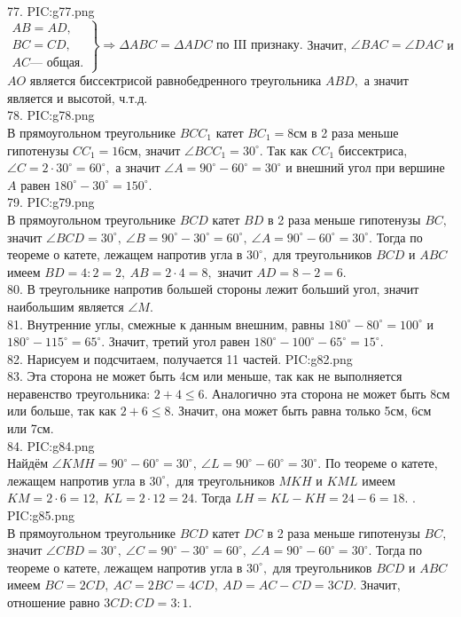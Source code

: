 77. {{PIC:g77.png}}\\
$\left.\begin{array}{l}AB=AD,\\
BC=CD,\\
AC\text{--- общая.}  \end{array}\right\}\Rightarrow \Delta ABC=\Delta ADC\text{ по III признаку.}$ Значит, $\angle BAC=\angle DAC$ и $AO$ является биссектрисой равнобедренного треугольника $ABD,$ а значит является и высотой, ч.т.д.\\
78. {{PIC:g78.png}}\\
В прямоугольном треугольнике $BCC_1$ катет $BC_1=8$см в 2 раза меньше гипотенузы $CC_1=16$см, значит $\angle BCC_1=30^\circ.$ Так как $CC_1$ биссектриса, $\angle C=2\cdot30^\circ=60^\circ,$ а значит $\angle A=90^\circ-60^\circ=30^\circ$ и внешний угол при вершине $A$ равен $180^\circ-30^\circ=150^\circ.$\\
79. {{PIC:g79.png}}\\
В прямоугольном треугольнике $BCD$ катет $BD$ в 2 раза меньше гипотенузы $BC,$ значит $\angle BCD=30^\circ,\ \angle B=90^\circ-30^\circ=60^\circ,\ \angle A=90^\circ-60^\circ=30^\circ.$ Тогда по теореме о катете, лежащем напротив угла в $30^\circ,$ для треугольников $BCD$ и $ABC$ имеем $BD=4:2=2,\ AB=2\cdot4=8,$ значит  $AD=8-2=6.$\\
80. В треугольнике напротив большей стороны лежит больший угол, значит наибольшим является $\angle M.$\\
81. Внутренние углы, смежные к данным внешним, равны $180^\circ-80^\circ=100^\circ$ и $180^\circ-115^\circ=65^\circ.$ Значит, третий угол равен $180^\circ-100^\circ-65^\circ=15^\circ.$\\
82. Нарисуем и подсчитаем, получается 11 частей.
{{PIC:g82.png}}\\
83. Эта сторона не может быть 4см или меньше, так как не выполняется неравенство треугольника: $2+4\leqslant6.$ Аналогично эта сторона не может быть 8см или больше, так как $2+6\leqslant8.$ Значит, она может быть равна только 5см, 6см или 7см.\\
84. {{PIC:g84.png}}\\
Найдём $\angle KMH=90^\circ-60^\circ=30^\circ,\ \angle L=90^\circ-60^\circ=30^\circ.$ По теореме о катете, лежащем напротив угла в $30^\circ,$ для треугольников $MKH$ и $KML$ имеем $KM=2\cdot6=12,\ KL=2\cdot12=24.$ Тогда $LH=KL-KH=24-6=18.$\newpage
{}. {{PIC:g85.png}}\\
В прямоугольном треугольнике $BCD$ катет $DC$ в 2 раза меньше гипотенузы $BC,$ значит $\angle CBD=30^\circ,\ \angle C=90^\circ-30^\circ=60^\circ,\ \angle A=90^\circ-60^\circ=30^\circ.$ Тогда по теореме о катете, лежащем напротив угла в $30^\circ,$ для треугольников $BCD$ и $ABC$ имеем $BC=2CD,\ AC=2BC=4CD,\ AD=AC-CD=3CD.$ Значит, отношение равно $3CD:CD=3:1.$\\
